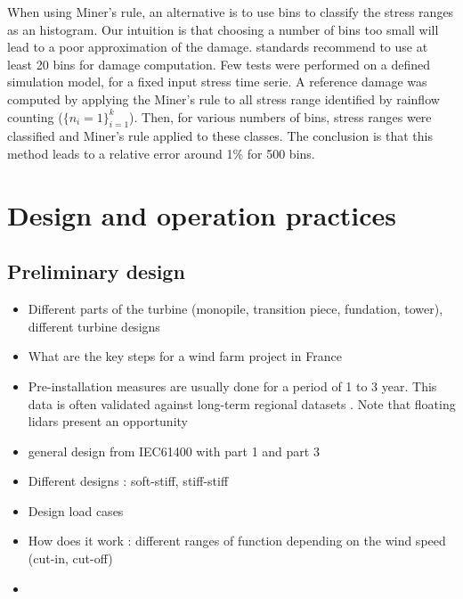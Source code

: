 When using Miner's rule, an alternative is to use bins to classify the stress ranges as an histogram. 
Our intuition is that choosing a number of bins too small will lead to a poor approximation of the damage. 
\cite{dnv_fatigue_2016} standards recommend to use at least 20 bins for damage computation. 
Few tests were performed on a defined simulation model, for a fixed input stress time serie. 
A reference damage was computed by applying the Miner's rule to all stress range identified by rainflow counting ($\{n_i = 1\}_{i=1}^k$). 
Then, for various numbers of bins, stress ranges were classified and Miner's rule applied to these classes. 
The conclusion is that this method leads to a relative error around 1\% for 500 bins. 




\section{Design and operation practices} \label{sec:owt_design}


\subsection{Preliminary design}
    \begin{itemize}
        \item Different parts of the turbine (monopile, transition piece, fundation, tower), different turbine designs
        \item What are the key steps for a wind farm project in France 
        \item Pre-installation measures are usually done for a period of 1 to 3 year. This data is often validated against long-term regional datasets \cite{sempreviva_2008_wind_assessment_review}. Note that floating lidars present an opportunity 
        \item general design from IEC61400 with part 1 and part 3
        \item Different designs : soft-stiff, stiff-stiff 
        \item Design load cases 
        \item How does it work : different ranges of function depending on the wind speed (cut-in, cut-off)
        \item 
    \end{itemize}

